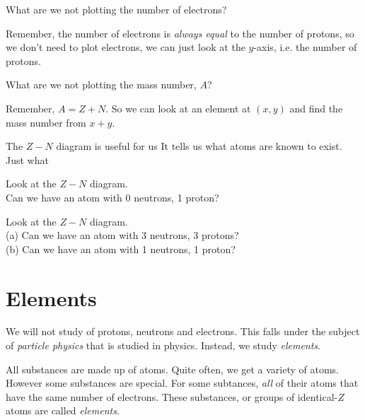 \frmrule

\begin{example}
What are we not plotting the number of electrons?

Remember, the number of electrons is \textit{always equal} to 
the number of protons, so we don't need to plot electrons, 
we can just look at the $y$-axis, i.e. the number of protons. 
\end{example}

\frmrule

\begin{example}
What are we not plotting the mass number, $A$?

Remember, $A = Z + N$. So we can look at an element 
at $(x,y)$ and find the mass number from $x + y$. 
\end{example}

The $Z-N$ diagram is useful for us 
It tells us what atoms are known to exist. Just what 



\frmrule

\begin{example}
Look at the $Z-N$ diagram. \\
Can we have an atom with 0 neutrons, 1 proton?
\end{example}

\frmrule

\begin{example}
Look at the $Z-N$ diagram. \\
(a) Can we have an atom with 3 neutrons, 3 protons? \\
(b) Can we have an atom with 1 neutrons, 1 proton? \\
\end{example}



\section{Elements}

We will not study of protons, neutrons and electrons. 
This falls under the subject of \textit{particle physics} that is studied 
in physics. Instead, we study \textit{elements}. 

All substances are made up of atoms. Quite often, we get a variety of 
atoms. However some substances are special. 
For some subtances, \textit{all} of their atoms that have the same 
number of electrons. These substances, or groups of identical-$Z$ atoms
are called \textit{elements}. 

